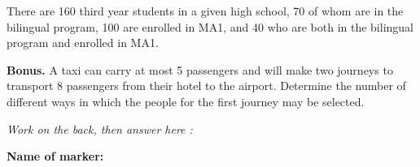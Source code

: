 \documentclass[9pt]{exam}
\begin{document}
\begin{questions}
{\begin{tikzpicture}[scale=0.75]
\end{tikzpicture}
\hfill
}


\question There are 160 third year students in a given high school, 70 of whom are in the bilingual program, 100 are enrolled in MA1, and 40 who are both in the bilingual program and enrolled in MA1. 


\question[0] \textbf{Bonus.} A taxi can carry at most 5 passengers and will make two journeys to transport 8 passengers from their hotel to the airport. Determine the number of different ways in which the people for the first journey may be selected. 

\emph{Work on the back, then answer here :} \dotfill

\end{questions}


\begin{tcolorbox}

\textbf{Name of marker:} 

\begin{center}
\gradetable[h][questions]
\end{center}

\end{tcolorbox}
\end{document}
